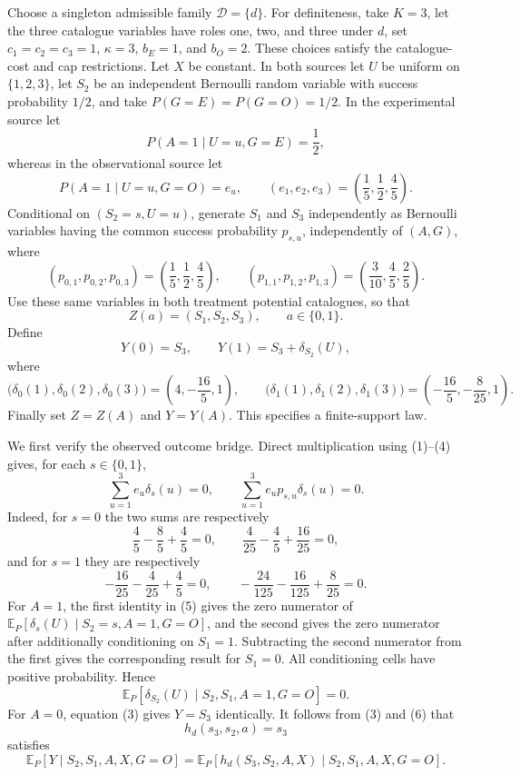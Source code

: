 Choose a singleton admissible family \(\mathcal D=\{d\}\).  For definiteness, take \(K=3\), let the three catalogue variables have roles one, two, and three under \(d\), set \(c_1=c_2=c_3=1\), \(\kappa=3\), \(b_E=1\), and \(b_O=2\).  These choices satisfy the catalogue-cost and cap restrictions.  Let \(X\) be constant.  In both sources let \(U\) be uniform on \(\{1,2,3\}\), let \(S_2\) be an independent Bernoulli random variable with success probability \(1/2\), and take \(P(G=E)=P(G=O)=1/2\).  In the experimental source let
\[
 P(A=1\mid U=u,G=E)=\frac12,
\]
whereas in the observational source let
\[
 P(A=1\mid U=u,G=O)=e_u,
 \qquad
 (e_1,e_2,e_3)=\left(\frac15,\frac12,\frac45\right).
 \tag{1}
\]
Conditional on \((S_2=s,U=u)\), generate \(S_1\) and \(S_3\) independently as Bernoulli variables having the common success probability \(p_{s,u}\), independently of \((A,G)\), where
\[
 (p_{0,1},p_{0,2},p_{0,3})
 =\left(\frac15,\frac12,\frac45\right),
 \qquad
 (p_{1,1},p_{1,2},p_{1,3})
 =\left(\frac3{10},\frac45,\frac25\right).
 \tag{2}
\]
Use these same variables in both treatment potential catalogues, so that
\[
 Z(a)=(S_1,S_2,S_3),
 \qquad a\in\{0,1\}.
\]
Define
\[
 Y(0)=S_3,
 \qquad
 Y(1)=S_3+\delta_{S_2}(U),
 \tag{3}
\]
where
\[
 \bigl(\delta_0(1),\delta_0(2),\delta_0(3)\bigr)
 =\left(4,-\frac{16}{5},1\right),
 \qquad
 \bigl(\delta_1(1),\delta_1(2),\delta_1(3)\bigr)
 =\left(-\frac{16}{5},-\frac8{25},1\right).
 \tag{4}
\]
Finally set \(Z=Z(A)\) and \(Y=Y(A)\).  This specifies a finite-support law.

We first verify the observed outcome bridge.  Direct multiplication using (1)--(4) gives, for each \(s\in\{0,1\}\),
\[
 \sum_{u=1}^3 e_u\delta_s(u)=0,
 \qquad
 \sum_{u=1}^3 e_up_{s,u}\delta_s(u)=0.
 \tag{5}
\]
Indeed, for \(s=0\) the two sums are respectively
\[
 \frac45-\frac85+\frac45=0,
 \qquad
 \frac4{25}-\frac45+\frac{16}{25}=0,
\]
and for \(s=1\) they are respectively
\[
 -\frac{16}{25}-\frac4{25}+\frac45=0,
 \qquad
 -\frac{24}{125}-\frac{16}{125}+\frac8{25}=0.
\]
For \(A=1\), the first identity in (5) gives the zero numerator of
\(\mathbb E_P[\delta_s(U)\mid S_2=s,A=1,G=O]\), and the second gives the zero numerator after additionally conditioning on \(S_1=1\).  Subtracting the second numerator from the first gives the corresponding result for \(S_1=0\).  All conditioning cells have positive probability.  Hence
\[
 \mathbb E_P[\delta_{S_2}(U)\mid S_2,S_1,A=1,G=O]=0.
 \tag{6}
\]
For \(A=0\), equation (3) gives \(Y=S_3\) identically.  It follows from (3) and (6) that
\[
 h_d(s_3,s_2,a)=s_3
 \tag{7}
\]
satisfies
\[
 \mathbb E_P[Y\mid S_2,S_1,A,X,G=O]
 =\mathbb E_P[h_d(S_3,S_2,A,X)\mid S_2,S_1,A,X,G=O].
 \tag{8}
\]


